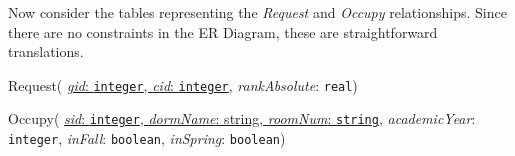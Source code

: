 Now consider the tables representing the \emph{Request} and \emph{Occupy}
relationships. Since there are no constraints in the ER Diagram, these are
straightforward translations.

\begin{description}
  \item Request(
        \ul{\emph{gid}: \texttt{integer},
        \emph{cid}: \texttt{integer}},
        \emph{rankAbsolute}: \texttt{real})

  \item Occupy(
        \ul{\emph{sid}: \texttt{integer},
        \emph{dormName}: string,
        \emph{roomNum}: \texttt{string}},
        \emph{academicYear}: \texttt{integer},
        \emph{inFall}: \texttt{boolean},
        \emph{inSpring}: \texttt{boolean})
\end{description}



